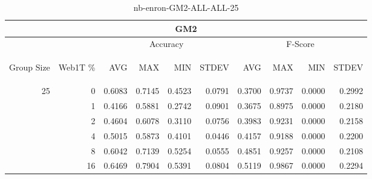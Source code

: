 \begin{center}
\begin{table}[htbp]
\begin{tabular}{ | r | r | r | r | r | r | r | r | r | r |}
\hline
\multicolumn{10}{|c|}{GM2}\\
\hline
 & & \multicolumn{4}{|c|}{Accuracy} & \multicolumn{4}{|c|}{F-Score}\\ \cline{3-10}
\begin{sideways}Group Size\end{sideways} & \begin{sideways}Web1T \%\end{sideways} & \begin{sideways}AVG\end{sideways} & \begin{sideways}MAX\end{sideways} & \begin{sideways}MIN\end{sideways} & \begin{sideways}STDEV\end{sideways} & \begin{sideways}AVG\end{sideways} & \begin{sideways}MAX\end{sideways} & \begin{sideways}MIN\end{sideways} & \begin{sideways}STDEV\end{sideways}\\
\hline
\multirow{6}{*}{25}
 & 0 & 0.6083 & 0.7145 & 0.4523 & 0.0791 & 0.3700 & 0.9737 & 0.0000 & 0.2992\\ \cline{2-10}
 & 1 & 0.4166 & 0.5881 & 0.2742 & 0.0901 & 0.3675 & 0.8975 & 0.0000 & 0.2180\\ \cline{2-10}
 & 2 & 0.4604 & 0.6078 & 0.3110 & 0.0756 & 0.3983 & 0.9231 & 0.0000 & 0.2158\\ \cline{2-10}
 & 4 & 0.5015 & 0.5873 & 0.4101 & 0.0446 & 0.4157 & 0.9188 & 0.0000 & 0.2200\\ \cline{2-10}
 & 8 & 0.6042 & 0.7139 & 0.5254 & 0.0555 & 0.4851 & 0.9257 & 0.0000 & 0.2108\\ \cline{2-10}
 & 16 & 0.6469 & 0.7904 & 0.5391 & 0.0804 & 0.5119 & 0.9867 & 0.0000 & 0.2294\\ \cline{2-10}
\hline
\end{tabular}
\caption{nb-enron-GM2-ALL-ALL-25}
\end{table}
\end{center}

